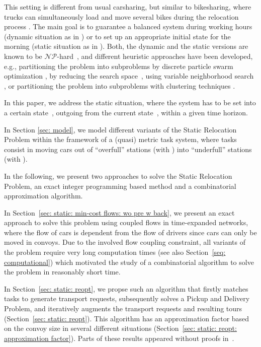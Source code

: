 \documentclass[english]{llncs}
\numberwithin{sublemma}{lemma}
\newcommand{\NPhard}{\ensuremath{\mathcal{NP}}\hbox{-}hard}
\begin{document}
This setting is different from usual carsharing, but similar to bikesharing, where trucks can simultaneously load and move several bikes during the relocation process \cite{Benchimol+etal:RAIRO,do-cmc2013,cirrelt-CMR-2012}.
The main goal is to guarantee a balanced system during working hours (dynamic situation as in \cite{cirrelt-CMR-2012,HKQWW:2015:ODY,HKQWW:LAGOS:2015,KQWW:2014:LNCS,LAGOS2013})
or to set up an appropriate initial state for the morning (static situation as in \cite{do-cmc2013,LAGOS2013}).
Both, the dynamic and the static versions are known to be \NPhard~\cite{Ball+etal:handbook:95a,Ball+etal:handbook:95b,do-cmc2013,Nemhauser+etal:handbook:89}, and different heuristic approaches have been developed, e.g., 
partitioning the problem into subproblems by
discrete particle swarm optimization \cite{CIE:GKA-2013},
by reducing the search space~\cite{KQWW:2014:LNCS},
using variable neighborhood search \cite{EvoCOP:HPHR-2013}, or
partitioning the problem into subproblems with clustering techniques \cite{SHH-2013}.





In this paper, we address the static situation, where the system has to be set into a certain state~, outgoing from the current state~, within a given time horizon.~ 

In Section \ref{sec: model}, we model different variants of the Static Relocation Problem within the framework of a (quasi) metric task system,
where tasks consist in moving cars out of ``overfull'' stations (with ) into ``underfull'' stations (with ).

In the following, we present two approaches to solve the Static Relocation Problem, an exact integer programming based method and a combinatorial approximation algorithm.

In Section~\ref{sec: static: min-cost flows: wo pre w back}, we present an exact approach to solve this problem using coupled flows in time-expanded networks,
where the flow of cars is dependent from the flow of drivers since cars can only be moved in convoys.
Due to the involved flow coupling constraint, all variants of the problem require very long computation times (see also Section~\ref{seq: computational})
which motivated the study of a combinatorial algorithm to solve the problem in reasonably short time.

In Section~\ref{sec: static: reopt}, we propse such an algorithm that firstly matches tasks to generate transport requests,
subsequently solves a Pickup and Delivery Problem, and iteratively augments the transport requests and resulting tours (Section~\ref{sec: static: reopt}). 
This algorithm has an approximation factor based on the convoy size in several different situations (Section~\ref{sec: static: reopt: approximation factor}).
Parts of these results appeared without proofs in~\cite{LAGOS2013}.
 
\end{document}
